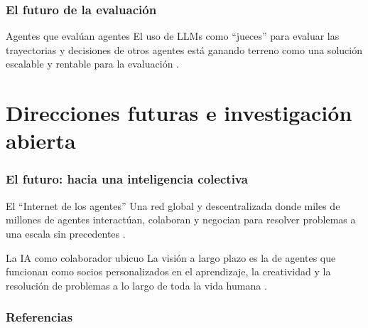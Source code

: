 \documentclass[handout]{beamer}
\begin{document}
\begin{frame}
    \frametitle{El futuro de la evaluación}
    \begin{alertblock}{Agentes que evalúan agentes}
    El uso de LLMs como ``jueces'' para evaluar las trayectorias y decisiones de otros agentes está ganando terreno como una solución escalable y rentable para la evaluación \parencite{zhuge2024agentasajudge}.
  \end{alertblock}
\end{frame}

\section{Direcciones futuras e investigación abierta}

\begin{frame}
  \frametitle{El futuro: hacia una inteligencia colectiva}
  \begin{block}{El ``Internet de los agentes''}
   Una red global y descentralizada donde miles de millones de agentes interactúan, colaboran y negocian para resolver problemas a una escala sin precedentes \parencite{yang2025surveyaiagentprotocols}.
  \end{block}
   \begin{exampleblock}{La IA como colaborador ubicuo}
   La visión a largo plazo es la de agentes que funcionan como socios personalizados en el aprendizaje, la creatividad y la resolución de problemas a lo largo de toda la vida humana \parencite{krishnan2025aiagentsevolutionarchitecture}.
   \end{exampleblock}
\end{frame}


\begin{frame}[allowframebreaks] 
  \frametitle{Referencias}
  \printbibliography
\end{frame}
\end{document}
